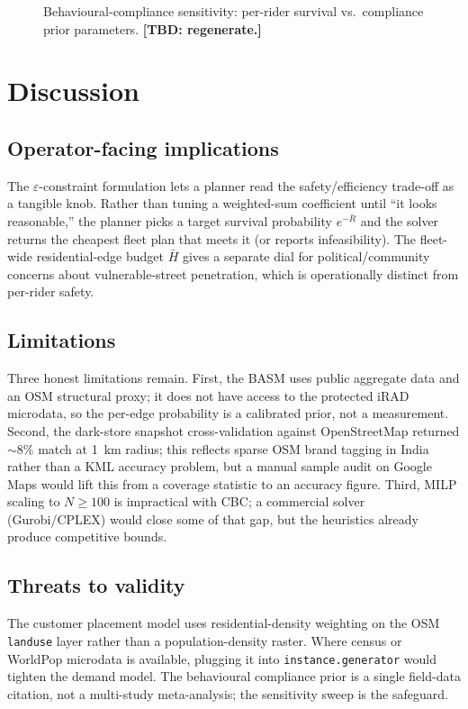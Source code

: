\documentclass{ieeeaccess}
\newcommand{\TBD}[1]{\textbf{[TBD: #1]}}
\begin{document}
\begin{figure}
\centerline{}
\caption{Behavioural-compliance sensitivity: per-rider survival vs.\
compliance prior parameters. \TBD{regenerate.}}
\label{fig:behav}
\end{figure}

\section{Discussion}
\label{sec:discussion}

\subsection{Operator-facing implications}
The $\varepsilon$-constraint formulation lets a planner read the
safety/efficiency trade-off as a tangible knob. Rather than tuning a
weighted-sum coefficient until ``it looks reasonable,'' the planner
picks a target survival probability $e^{-\bar{R}}$ and the solver
returns the cheapest fleet plan that meets it (or reports
infeasibility). The fleet-wide residential-edge budget $\bar{H}$
gives a separate dial for political/community concerns about
vulnerable-street penetration, which is operationally distinct from
per-rider safety.

\subsection{Limitations}
Three honest limitations remain. First, the BASM uses public aggregate
data and an OSM structural proxy; it does not have access to the
protected iRAD microdata, so the per-edge probability is a calibrated
prior, not a measurement. Second, the dark-store snapshot
cross-validation against OpenStreetMap returned $\sim$8\% match at
1~km radius; this reflects sparse OSM brand tagging in India rather
than a KML accuracy problem, but a manual sample audit on Google Maps
would lift this from a coverage statistic to an accuracy figure.
Third, MILP scaling to $N \geq 100$ is impractical with CBC; a
commercial solver (Gurobi/CPLEX) would close some of that gap, but
the heuristics already produce competitive bounds.

\subsection{Threats to validity}
The customer placement model uses residential-density weighting on
the OSM \texttt{landuse} layer rather than a population-density
raster. Where census or WorldPop microdata is available, plugging it
into \texttt{instance.generator} would tighten the demand model. The
behavioural compliance prior is a single field-data citation, not a
multi-study meta-analysis; the sensitivity sweep is the safeguard.
\end{document}
